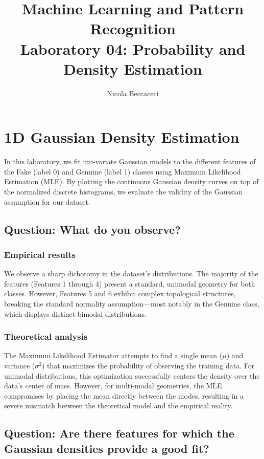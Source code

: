 \documentclass[12pt, a4paper]{article}
\title{Machine Learning and Pattern Recognition\\ \large Laboratory 04: Probability and Density Estimation}
\author{Nicola Beccaceci}
\date{}
\begin{document}
\maketitle

\section*{1D Gaussian Density Estimation}

In this laboratory, we fit uni-variate Gaussian models to the different features of the Fake (label 0) and Genuine (label 1) classes using Maximum Likelihood Estimation (MLE). By plotting the continuous Gaussian density curves on top of the normalized discrete histograms, we evaluate the validity of the Gaussian assumption for our dataset.

\subsection*{Question: What do you observe?}

\subsubsection*{Empirical results}
We observe a sharp dichotomy in the dataset's distributions. The majority of the features (Features 1 through 4) present a standard, unimodal geometry for both classes. However, Features 5 and 6 exhibit complex topological structures, breaking the standard normality assumption—most notably in the Genuine class, which displays distinct bimodal distributions.

\subsubsection*{Theoretical analysis}
The Maximum Likelihood Estimator attempts to find a single mean ($\mu$) and variance ($\sigma^2$) that maximizes the probability of observing the training data. For unimodal distributions, this optimization successfully centers the density over the data's center of mass. However, for multi-modal geometries, the MLE compromises by placing the mean directly between the modes, resulting in a severe mismatch between the theoretical model and the empirical reality.

\subsection*{Question: Are there features for which the Gaussian densities provide a good fit?}
\end{document}
